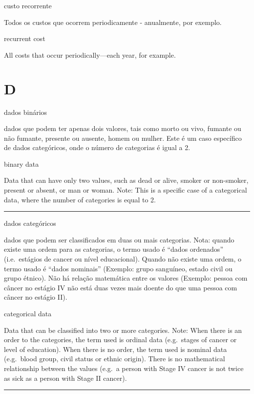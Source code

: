\documentclass[
  openany]{book}
\begin{document}
custo recorrente

Todos os custos que ocorrem periodicamente - anualmente, por exemplo.

recurrent cost

All costs that occur periodically---each year, for example.

\hypertarget{d}{%
\chapter*{D}\label{d}}

dados binários

dados que podem ter apenas dois valores, tais como morto ou vivo, fumante ou não fumante, presente ou ausente, homem ou mulher. Este é um caso específico de dados categóricos, onde o número de categorias é igual a 2.

binary data

Data that can have only two values, such as dead or alive, smoker or non-smoker, present or absent, or man or woman. Note: This is a specific case of a categorical data, where the number of categories is equal to 2.

\begin{center}\rule{0.5\linewidth}{0.5pt}\end{center}

dados categóricos

dados que podem ser classificados em duas ou mais categorias. Nota: quando existe uma ordem para as categorias, o termo usado é ``dados ordenados'' (i.e.~estágios de cancer ou nível educacional). Quando não existe uma ordem, o termo usado é ``dados nominais'' (Exemplo: grupo sanguíneo, estado civil ou grupo étnico). Não há relação matemática entre os valores (Exemplo: pessoa com câncer no estágio IV não está duas vezes mais doente do que uma pessoa com câncer no estágio II).

categorical data

Data that can be classified into two or more categories. Note: When there is an order to the categories, the term used is ordinal data (e.g.~stages of cancer or level of education). When there is no order, the term used is nominal data (e.g.~blood group, civil status or ethnic origin). There is no mathematical relationship between the values (e.g.~a person with Stage IV cancer is not twice as sick as a person with Stage II cancer).

\begin{center}\rule{0.5\linewidth}{0.5pt}\end{center}
\end{document}

